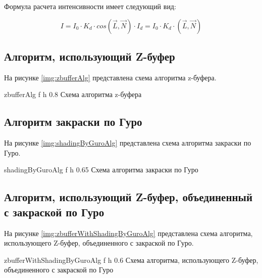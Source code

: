Формула расчета интенсивности имеет следующий вид:

\begin{equation}
	\label{equ:lambert}
	I = I_0 \cdot K_d \cdot cos(\vec{L}, \vec{N}) \cdot I_d = I_0 \cdot K_d \cdot (\vec{L}, \vec{N})
\end{equation}


\subsection{Алгоритм, использующий Z-буфер}

На рисунке \ref{img:zbufferAlg} представлена схема алгоритма  z-буфера.

{zbufferAlg} %
{f} %
{h} %
{0.8\textwidth} %
{Схема алгоритма z-буфера} %

\clearpage

\subsection{Алгоритм закраски по Гуро}

На рисунке \ref{img:shadingByGuroAlg} представлена схема алгоритма закраски по Гуро.

{shadingByGuroAlg} %
{f} %
{h} %
{0.65\textwidth} %
{Схема алгоритма закраски по Гуро} %

\clearpage

\subsection{Алгоритм, использующий Z-буфер, объединенный с закраской по Гуро}

На рисунке \ref{img:zbufferWithShadingByGuroAlg} представлена схема алгоритма, использующего Z-буфер, объединенного с закраской по Гуро.

{zbufferWithShadingByGuroAlg} %
{f} %
{h} %
{0.6\textwidth} %
{Схема алгоритма, использующего Z-буфер, объединенного с закраской по Гуро} %